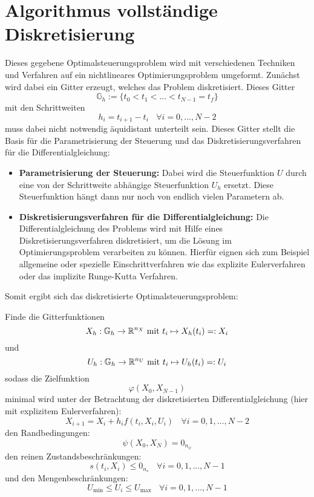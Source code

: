 \section{Algorithmus vollständige Diskretisierung}
Dieses gegebene Optimalsteuerungsproblem wird mit verschiedenen Techniken und Verfahren auf ein nichtlineares Optimierungsproblem umgeformt. Zunächst wird dabei ein Gitter erzeugt, welches das Problem diskretisiert. Dieses Gitter
\begin{equation}
\mathbb{G}_h := \lbrace t_0 < t_1 < ... < t_{N-1} = t_f \rbrace
\end{equation}
mit den Schrittweiten 
\begin{equation}
h_i = t_{i+1} - t_i \ \ \ \ \forall i = 0,...,N-2
\end{equation}
muss dabei nicht notwendig äquidistant unterteilt sein. Dieses Gitter stellt die Basis für die Parametrisierung der Steuerung und das Diskretisierungsverfahren für die Differentialgleichung:
\begin{itemize}
\item \textbf{Parametrisierung der Steuerung:} Dabei wird die Steuerfunktion $U$ durch eine von der Schrittweite abhängige Steuerfunktion $U_h$ ersetzt. Diese Steuerfunktion hängt dann nur noch von endlich vielen Parametern ab.
%
\item \textbf{Diskretisierungsverfahren für die Differentialgleichung:} Die Differentialgleichung des Problems wird mit Hilfe eines Diskretisierungsverfahren diskretisiert, um die Lösung im Optimierungsproblem verarbeiten zu können. Hierfür eignen sich zum Beispiel allgemeine oder spezielle Einschrittverfahren wie das explizite Eulerverfahren oder das implizite Runge-Kutta Verfahren.
\end{itemize}
Somit ergibt sich das diskretisierte Optimalsteuerungsproblem:

Finde die Gitterfunktionen \[X_h : \mathbb{G}_h \to \mathbb{R}^{n_X} \text{ mit } t_i \mapsto X_h(t_i) =: X_i\] und \[U_h : \mathbb{G}_h \to \mathbb{R}^{n_U} \text{ mit } t_i \mapsto U_h(t_i) =: U_i\] sodass die Zielfunktion \[\varphi(X_0,X_{N-1})\] minimal wird unter der Betrachtung der diskretisierten  Differentialgleichung (hier mit explizitem Eulerverfahren): \[X_{i+1} = X_{i} + h_i f(t_i,X_i,U_i) \ \ \ \ \forall i = 0,1,...,N-2\] den Randbedingungen: \[\psi(X_0,X_N) = 0_{n_{\psi}}\] den reinen Zustandsbeschränkungen: \[s(t_i,X_i) \leq 0_{n_s} \ \ \ \ \forall i = 0,1,...,N-1\] und den Mengenbeschränkungen: \[U_{\min} \leq U_i \leq U_{\max} \ \ \ \ \forall i = 0,1,...,N-1\]


